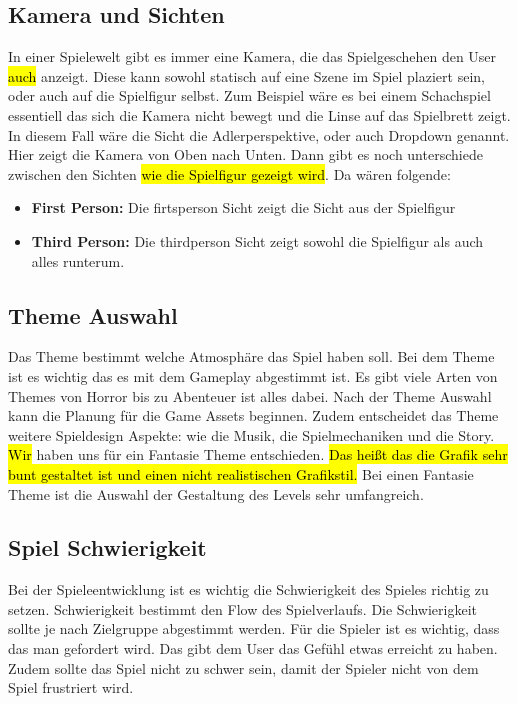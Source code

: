 \subsection{Kamera und Sichten}
In einer Spielewelt gibt es immer eine Kamera, die das Spielgeschehen den User \hl{auch} anzeigt. Diese kann sowohl statisch auf eine Szene im Spiel plaziert sein, oder auch auf die Spielfigur selbst. Zum Beispiel wäre es bei einem Schachspiel essentiell das sich die Kamera nicht bewegt und die Linse auf das Spielbrett zeigt. In diesem Fall wäre die Sicht die Adlerperspektive, oder auch Dropdown genannt. Hier zeigt die Kamera von Oben nach Unten. Dann gibt es noch unterschiede zwischen den Sichten \hl{wie die Spielfigur gezeigt wird}. Da wären folgende:

\begin{itemize}
    \item \textbf{First Person:}
    \noindent Die firtsperson Sicht zeigt die Sicht aus der Spielfigur
    \item \textbf{Third Person:}
    \noindent Die thirdperson Sicht zeigt sowohl die Spielfigur als auch alles runterum. 
\end{itemize}

\subsection{Theme Auswahl}
Das Theme bestimmt welche Atmosphäre das Spiel haben soll. Bei dem Theme ist es wichtig das es mit dem Gameplay abgestimmt ist. Es gibt viele Arten von Themes von Horror bis zu Abenteuer ist alles dabei. Nach der Theme Auswahl kann die Planung für die Game Assets beginnen. Zudem entscheidet das Theme weitere Spieldesign Aspekte: wie die Musik, die Spielmechaniken und die  Story. \hl{Wir} haben uns für ein Fantasie Theme entschieden. \hl{Das heißt das die Grafik sehr bunt gestaltet ist und einen nicht realistischen Grafikstil.} Bei einen Fantasie Theme ist die Auswahl der Gestaltung des Levels sehr umfangreich. 


\subsection{Spiel Schwierigkeit}

Bei der Spieleentwicklung ist es wichtig die Schwierigkeit des Spieles richtig zu setzen. Schwierigkeit bestimmt den Flow des Spielverlaufs. Die Schwierigkeit sollte je nach Zielgruppe abgestimmt werden. Für die Spieler ist es wichtig, dass das man gefordert wird. Das gibt dem User das Gefühl etwas erreicht zu haben. Zudem sollte das Spiel nicht zu schwer sein, damit der Spieler nicht von dem Spiel frustriert wird.

